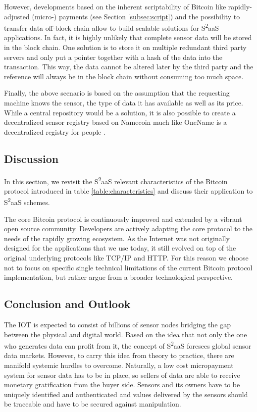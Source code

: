However, developments based on the inherent scriptability of Bitcoin like rapidly-adjusted (micro-) payments (see Section \ref{subsec:script}) and the possibility to transfer data off-block chain allow to build scalable solutions for S\textsuperscript{2}aaS applications. In fact, it is highly unlikely that complete sensor data will be stored in the block chain. One solution is to store it on multiple redundant third party servers and only put a pointer together with a hash of the data into the transaction. This way, the data cannot be altered later by the third party and the reference will always be in the block chain without consuming too much space.

Finally, the above scenario is based on the assumption that the requesting machine knows the sensor, the type of data it has available as well as its price. While a central repository would be a solution, it is also possible to create a decentralized sensor registry based on Namecoin much like OneName is a decentralized registry for people \cite{onename.io}.

\subsection{Discussion}
\label{sec:discussion}

In this section, we revisit the S\textsuperscript{2}aaS relevant characteristics of the Bitcoin protocol introduced in table \ref{table:characteristics} and discuss their application to S\textsuperscript{2}aaS schemes. 

The core Bitcoin protocol is continuously improved and extended by a vibrant open source community. Developers are actively adapting the core protocol to the needs of the rapidly growing ecosystem. As the Internet was not originally designed for the applications that we use today, it still evolved on top of the original underlying protocols like TCP/IP and HTTP. For this reason we choose not to focus on specific single technical limitations of the current Bitcoin protocol implementation, but rather argue from a broader technological perspective.



\subsection{Conclusion and Outlook}

The IOT is expected to consist of billions of sensor nodes bridging the gap between the physical and digital world. Based on the idea that not only the one who generates data can profit from it, the concept of S\textsuperscript{2}aaS foresees global sensor data markets. However, to carry this idea from theory to practice, there are manifold systemic hurdles to overcome. Naturally, a low cost micropayment system for sensor data has to be in place, so sellers of data are able to receive monetary gratification from the buyer side. Sensors and its owners have to be uniquely identified and authenticated and values delivered by the sensors should be traceable and have to be secured against manipulation. 

